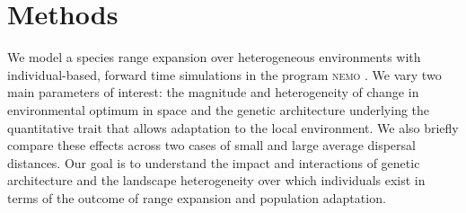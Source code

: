 





\section{Methods}


We model a species range expansion over heterogeneous environments with individual-based, forward time simulations in the program \textsc{nemo} \citep{Guillaume:2006}. We vary two main parameters of interest: the magnitude and heterogeneity of change in environmental optimum in space and the genetic architecture underlying the quantitative trait that allows adaptation to the local environment. We also briefly compare these effects across two cases of small and large average dispersal distances. Our goal is to understand the impact and interactions of genetic architecture and the landscape heterogeneity over which individuals exist in terms of the outcome of range expansion and population adaptation.

